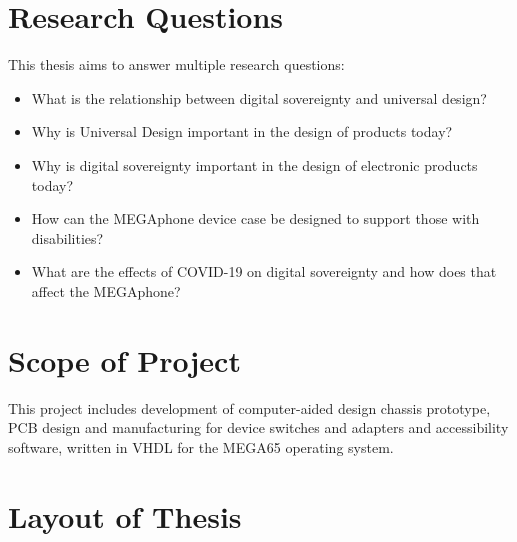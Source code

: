 
\section{Research Questions}

This thesis aims to answer multiple research questions:

\begin{itemize} 
    \item What is the relationship between digital sovereignty and universal design?
    \item Why is Universal Design important in the design of products today?
    \item Why is digital sovereignty important in the design of electronic products today?
    \item How can the MEGAphone device case be designed to support those with disabilities?
    \item What are the effects of COVID-19 on digital sovereignty and how does that affect the MEGAphone?
    \end{itemize}


\section{Scope of Project}

This project includes development of computer-aided design chassis prototype, PCB design and manufacturing for device switches and adapters and accessibility software, written in VHDL for the MEGA65 operating system.


\section{Layout of Thesis}

